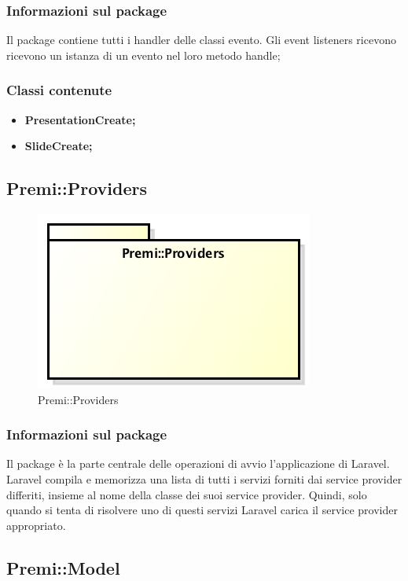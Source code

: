 \subsubsection*{Informazioni sul package}
Il package contiene tutti i handler delle classi evento. Gli event listeners ricevono ricevono un istanza di un evento nel loro metodo handle;
\subsubsection*{Classi contenute}
\begin{itemize}
	\item \textbf{PresentationCreate; }
	\item \textbf{SlideCreate; }
\end{itemize}

\subsection{Premi::Providers}
\begin{figure}[h]
	\centering
	\includegraphics[width=0.6\linewidth]{img/premi_providers}
	\caption[Premi::Providers]{Premi::Providers}
	\label{fig:premi_providers}
\end{figure}

\subsubsection*{Informazioni sul package}
Il package è la parte centrale delle operazioni di avvio l'applicazione di \gls{Laravel}. \gls{Laravel} compila e memorizza una lista di tutti i servizi forniti dai service provider differiti, insieme al nome della classe dei suoi service provider. Quindi, solo quando si tenta di risolvere uno di questi servizi \gls{Laravel} carica il service provider appropriato.


\newpage
\subsection{Premi::Model}
